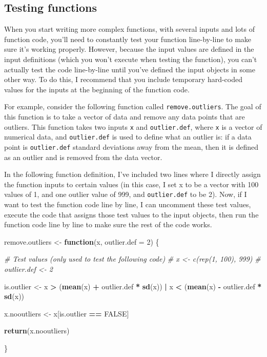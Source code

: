 \documentclass[]{book}
\newenvironment{Shaded}{\begin{snugshade}}{\end{snugshade}}
\newcommand{\KeywordTok}[1]{\textcolor[rgb]{0.13,0.29,0.53}{\textbf{#1}}}
\newcommand{\DataTypeTok}[1]{\textcolor[rgb]{0.13,0.29,0.53}{#1}}
\newcommand{\DecValTok}[1]{\textcolor[rgb]{0.00,0.00,0.81}{#1}}
\newcommand{\StringTok}[1]{\textcolor[rgb]{0.31,0.60,0.02}{#1}}
\newcommand{\CommentTok}[1]{\textcolor[rgb]{0.56,0.35,0.01}{\textit{#1}}}
\newcommand{\OtherTok}[1]{\textcolor[rgb]{0.56,0.35,0.01}{#1}}
\newcommand{\ControlFlowTok}[1]{\textcolor[rgb]{0.13,0.29,0.53}{\textbf{#1}}}
\newcommand{\OperatorTok}[1]{\textcolor[rgb]{0.81,0.36,0.00}{\textbf{#1}}}
\newcommand{\NormalTok}[1]{#1}
\theoremstyle{definition}
\theoremstyle{definition}
\theoremstyle{remark}
\begin{document}
\subsection{Testing functions}\label{testing-functions}

When you start writing more complex functions, with several inputs and
lots of function code, you'll need to constantly test your function
line-by-line to make sure it's working properly. However, because the
input values are defined in the input definitions (which you won't
execute when testing the function), you can't actually test the code
line-by-line until you've defined the input objects in some other way.
To do this, I recommend that you include temporary hard-coded values for
the inputs at the beginning of the function code.

For example, consider the following function called
\texttt{remove.outliers}. The goal of this function is to take a vector
of data and remove any data points that are outliers. This function
takes two inputs \texttt{x} and \texttt{outlier.def}, where \texttt{x}
is a vector of numerical data, and \texttt{outlier.def} is used to
define what an outlier is: if a data point is \texttt{outlier.def}
standard deviations away from the mean, then it is defined as an outlier
and is removed from the data vector.

In the following function definition, I've included two lines where I
directly assign the function inputs to certain values (in this case, I
set x to be a vector with 100 values of 1, and one outlier value of 999,
and \texttt{outlier.def} to be 2). Now, if I want to test the function
code line by line, I can uncomment these test values, execute the code
that assigns those test values to the input objects, then run the
function code line by line to make sure the rest of the code works.

\begin{Shaded}
\begin{Highlighting}[]
\NormalTok{remove.outliers <-}\StringTok{ }\ControlFlowTok{function}\NormalTok{(x, }\DataTypeTok{outlier.def =} \DecValTok{2}\NormalTok{) \{}

\CommentTok{# Test values (only used to test the following code)}
\CommentTok{#  x <- c(rep(1, 100), 999)}
\CommentTok{#  outlier.def <- 2}

\NormalTok{  is.outlier <-}\StringTok{ }\NormalTok{x }\OperatorTok{>}\StringTok{ }\NormalTok{(}\KeywordTok{mean}\NormalTok{(x) }\OperatorTok{+}\StringTok{ }\NormalTok{outlier.def }\OperatorTok{*}\StringTok{ }\KeywordTok{sd}\NormalTok{(x)) }\OperatorTok{|}\StringTok{ }
\StringTok{                }\NormalTok{x }\OperatorTok{<}\StringTok{ }\NormalTok{(}\KeywordTok{mean}\NormalTok{(x) }\OperatorTok{-}\StringTok{ }\NormalTok{outlier.def }\OperatorTok{*}\StringTok{ }\KeywordTok{sd}\NormalTok{(x))}
  
\NormalTok{  x.nooutliers <-}\StringTok{ }\NormalTok{x[is.outlier }\OperatorTok{==}\StringTok{ }\OtherTok{FALSE}\NormalTok{]}

  \KeywordTok{return}\NormalTok{(x.nooutliers)}

\NormalTok{\}}
\end{Highlighting}
\end{Shaded}
\end{document}
